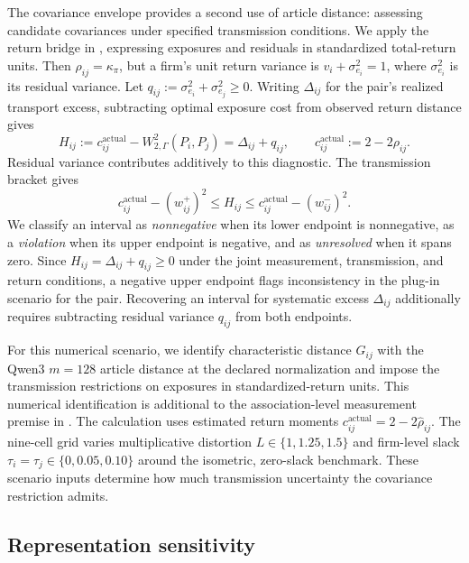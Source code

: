 The covariance envelope provides a second use of article distance:
assessing candidate covariances under specified transmission conditions.
We apply the return bridge in , expressing exposures
and residuals in standardized total-return units.
Then $\rho_{ij}=\kappa_\pi$, but a firm's unit return variance is
$v_i+\sigma_{e_i}^2=1$, where $\sigma_{e_i}^2$ is its residual variance.
Let $q_{ij}:=\sigma_{e_i}^2+\sigma_{e_j}^2\ge0$.
Writing $\Delta_{ij}$ for the pair's realized transport excess, subtracting
optimal exposure cost from observed return distance gives
\begin{equation}\label{eq:total-return-excess-correction}
  H_{ij}:=c^{\mathrm{actual}}_{ij}-W_{2,\Gamma}^2(P_i,P_j)
  =\Delta_{ij}+q_{ij},
  \qquad c^{\mathrm{actual}}_{ij}:=2-2\rho_{ij}.
\end{equation}
Residual variance contributes additively to this diagnostic.
The transmission bracket gives
\begin{equation}\label{eq:random-transport-excess-bracket}
  c^{\mathrm{actual}}_{ij}-(w^+_{ij})^2
  \le H_{ij}
  \le c^{\mathrm{actual}}_{ij}-(w^-_{ij})^2.
\end{equation}
We classify an interval as \emph{nonnegative} when its lower endpoint is
nonnegative, as a \emph{violation} when its upper endpoint is negative, and
as \emph{unresolved} when it spans zero.
Since $H_{ij}=\Delta_{ij}+q_{ij}\ge0$ under the joint measurement,
transmission, and return conditions, a negative upper endpoint flags
inconsistency in the plug-in scenario for the pair.
Recovering an interval for systematic excess $\Delta_{ij}$ additionally
requires subtracting residual variance $q_{ij}$ from both endpoints.

For this numerical scenario, we identify characteristic distance $G_{ij}$
with the Qwen3 $m=128$ article distance at the declared normalization and
impose the transmission restrictions on exposures in standardized-return units.
This numerical identification is additional to the association-level
measurement premise in .
The calculation uses estimated return moments
$c^{\mathrm{actual}}_{ij}=2-2\hat\rho_{ij}$.
The nine-cell grid varies multiplicative distortion
$L\in\{1,1.25,1.5\}$ and firm-level slack
$\tau_i=\tau_j\in\{0,0.05,0.10\}$ around the isometric, zero-slack benchmark.
These scenario inputs determine how much transmission uncertainty the
covariance restriction admits.

\subsection{Representation sensitivity}\label{sec:representation-ladder}

